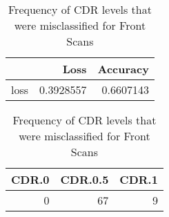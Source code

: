 \begin{table}[h] \centering
\begin{minipage}{0.3\textwidth}

\begin{tabular}{lrr}
\toprule
  & Loss & Accuracy\\
\midrule
loss & 0.3928557 & 0.6607143\\
\bottomrule
\end{tabular}
\caption{Error and Accuracy for Convolution on Front Scans}
\end{minipage}
\hspace{3cm}
\begin{minipage}{0.3\textwidth}

\begin{tabular}{rrr}
\toprule
CDR.0 & CDR.0.5 & CDR.1\\
\midrule
0 & 67 & 9\\
\bottomrule
\end{tabular}
\caption{Frequency of CDR levels that were misclassified for Front Scans}
\end{minipage}
\end{table}
